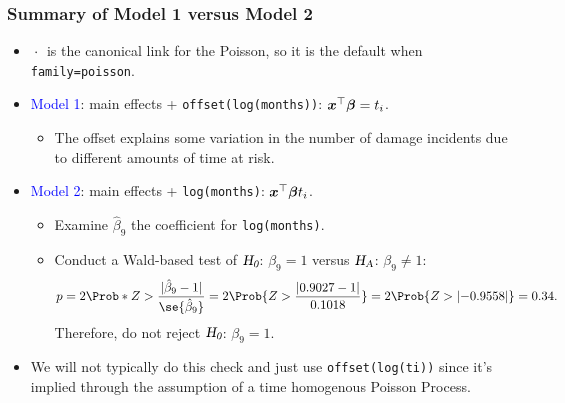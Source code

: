 \documentclass[oneside]{book}\usepackage[]{graphicx}\usepackage[svgnames]{xcolor}
\let\log\relax%
\newcommand{\HN}{\textsl{H}_{\textsl{0}}}%
\newcommand{\HA}{\textsl{H}_{\textsl{A}}}%
\DeclarePairedDelimiter\abs{\lvert}{\rvert}
\providecommand{\Vector}[1]{\bm{#1}}%
\begin{document}
\subsubsection*{Summary of Model 1 versus Model 2}
\begin{itemize}
      \item $ \log{\:\cdot\:} $ is the canonical link for the Poisson, so it is the default when \texttt{family=poisson}.
      \item \textcolor{Blue}{Model 1}: main effects + \texttt{offset(log(months))}: $ \Vector{x}^\top \Vector{\beta}=\log{t_i} $.
            \begin{itemize}
                  \item The offset explains some variation in the number of damage incidents due to
                        different amounts of time at risk.
            \end{itemize}
      \item \textcolor{Blue}{Model 2}: main effects + \texttt{log(months)}: $ \Vector{x}^\top \Vector{\beta}\log{t_i} $.
            \begin{itemize}
                  \item Examine $ \hat{\beta}_9 $ the coefficient for \texttt{log(months)}.
                  \item Conduct a Wald-based test of $ \HN $: $ \beta_9=1 $ versus $ \HA $: $ \beta_9\ne 1 $:
                        \[ p=2\Prob*{Z>\frac{\abs{\hat{\beta}_9-1}}{\se{\hat{\beta}_9}}}=2\Prob{Z>\frac{\abs{0.9027-1}}{0.1018}}=2\Prob{Z>\abs{-0.9558}}=0.34. \]
                        Therefore, do not reject $ \HN $: $ \beta_9=1 $.
            \end{itemize}
      \item We will not typically do this check and just use \texttt{offset(log(ti))} since it's implied
            through the assumption of a time homogenous Poisson Process.
\end{itemize}
\end{document}
